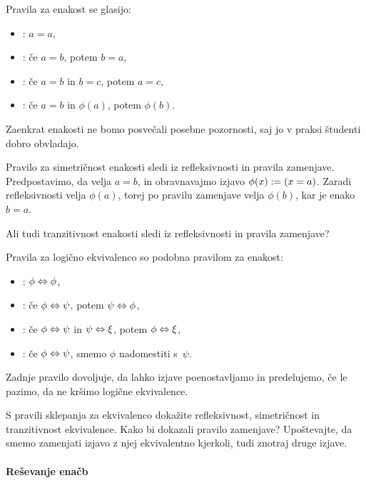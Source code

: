 Pravila za enakost se glasijo:
%
\begin{itemize}
\item {}: $a = a$,
\item {}: če $a = b$, potem $b = a$,
\item {}: če $a = b$ in $b = c$, potem $a = c$,
\item {}: če $a = b$ in $\phi(a)$, potem $\phi(b)$.
\end{itemize}
%
Zaenkrat enakosti ne bomo posvečali posebne pozornosti, saj jo v praksi študenti dobro obvladajo.

\begin{zgled}
  Pravilo za simetričnost enakosti sledi iz refleksivnosti in pravila zamenjave.
  Predpostavimo, da velja $a = b$, in obravnavajmo izjavo $\phi(x) \mathrel{{:}{=}} (x = a)$.
  Zaradi refleksivnosti velja $\phi(a)$, torej po pravilu zamenjave velja $\phi(b)$,
  kar je enako $b = a$.
\end{zgled}

\begin{vaja}
  Ali tudi tranzitivnost enakosti sledi iz refleksivnosti in pravila zamenjave?
\end{vaja}

Pravila za logično ekvivalenco so podobna pravilom za enakost:
%
\begin{itemize}
\item {}: $\phi \Leftrightarrow \phi$,
\item {}: če $\phi \Leftrightarrow \psi$, potem $\psi \Leftrightarrow \phi$,
\item {}: če $\phi \Leftrightarrow \psi$ in $\psi \Leftrightarrow \xi$, potem $\phi \Leftrightarrow \xi$,
\item {}: če $\phi \Leftrightarrow \psi$, smemo $\phi$ nadomestiti s~$\psi$.
\end{itemize}
%
Zadnje pravilo dovoljuje, da lahko izjave poenostavljamo in predelujemo, če le pazimo, da ne kršimo logične ekvivalence.

\begin{vaja}
  S pravili sklepanja za ekvivalenco dokažite refleksivnost, simetričnost in tranzitivnost ekvivalence.
  Kako bi dokazali pravilo zamenjave? Upoštevajte, da smemo zamenjati izjavo z njej ekvivalentno kjerkoli, tudi znotraj druge izjave.
\end{vaja}

\paragraph*{Reševanje enačb}

